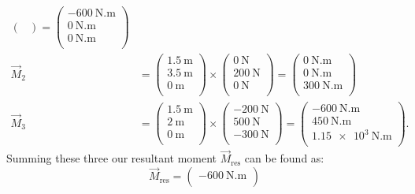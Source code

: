 \begin{derivation}
\begin{align*}
\begin{pmatrix}
    \end{pmatrix} = \begin{pmatrix}
      -\qty{600}{\N.\m} \\
    \qty{0}{\N.\m} \\
    \qty{0}{\N.\m} \\
    \end{pmatrix} \\
    \Vec{M}_2 &= \begin{pmatrix}
      \qty{1.5}{\m} \\
    \qty{3.5}{\m} \\
    \qty{0}{\m} \\
    \end{pmatrix} \times \begin{pmatrix}
      \qty{0}{\N} \\
    \qty{200}{\N} \\
    \qty{0}{\N} \\
    \end{pmatrix}  = \begin{pmatrix}
      \qty{0}{\N.\m} \\
    \qty{0}{\N.\m} \\
    \qty{300}{\N.\m} \\
    \end{pmatrix} \\
    \Vec{M}_3 &= \begin{pmatrix}
      \qty{1.5}{\m} \\
    \qty{2}{\m} \\
    \qty{0}{\m} \\
    \end{pmatrix} \times \begin{pmatrix}
      - \qty{200}{\N} \\
    \qty{500}{\N} \\
    - \qty{300}{\N} \\
    \end{pmatrix} = \begin{pmatrix}
      -\qty{600}{\N.\m} \\
    \qty{450}{\N.\m} \\
    \qty{1,15e3}{\N.\m} \\
    \end{pmatrix}
  .\end{align*}
  Summing these three our resultant moment $\Vec{M}_{\mathrm{res}}$ can be found as:
  \begin{equation*}
    \Vec{M}_{\mathrm{res}} = \begin{pmatrix}
      - \qty{600}{\N.\m} \\

\end{pmatrix}
\end{equation*}
\end{derivation}
